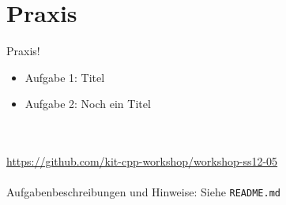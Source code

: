 \section{Praxis}
\begin{frame}[fragile]{Praxis!}
	\begin{itemize}
		\item Aufgabe 1: Titel
		\item Aufgabe 2: Noch ein Titel
	\end{itemize}
	\ \\
	\ \\
	\large{\url{https://github.com/kit-cpp-workshop/workshop-ss12-05}} \\
	\ \\
	Aufgabenbeschreibungen und Hinweise: Siehe \verb|README.md|

\end{frame}
